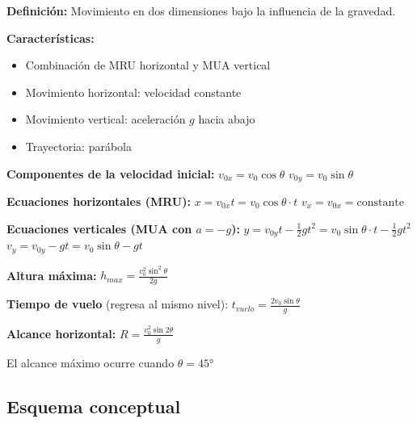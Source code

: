 \begin{seccion}

\begin{definicion}
    \textbf{Definición:} Movimiento en dos dimensiones bajo la influencia de la gravedad.
\end{definicion}

\vspace{0.3cm}

\textbf{Características:}
\begin{itemize}
    \item Combinación de MRU horizontal y MUA vertical
    \item Movimiento horizontal: velocidad constante
    \item Movimiento vertical: aceleración $g$ hacia abajo
    \item Trayectoria: parábola
\end{itemize}

\begin{ecuacion}
\textbf{Componentes de la velocidad inicial:}
$v_{0x} = v_0 \cos \theta$
$v_{0y} = v_0 \sin \theta$

\textbf{Ecuaciones horizontales (MRU):}
$x = v_{0x} t = v_0 \cos \theta \cdot t$
$v_x = v_{0x} = \text{constante}$

\textbf{Ecuaciones verticales (MUA con $a = -g$):}
$y = v_{0y} t - \frac{1}{2}gt^2 = v_0 \sin \theta \cdot t - \frac{1}{2}gt^2$
$v_y = v_{0y} - gt = v_0 \sin \theta - gt$

\textbf{Altura máxima:}
$h_{max} = \frac{v_0^2 \sin^2 \theta}{2g}$

\textbf{Tiempo de vuelo} (regresa al mismo nivel):
$t_{vuelo} = \frac{2v_0 \sin \theta}{g}$

\textbf{Alcance horizontal:}
$R = \frac{v_0^2 \sin 2\theta}{g}$

El alcance máximo ocurre cuando $\theta = 45°$
\end{ecuacion}
\end{seccion}

\subsection{Esquema conceptual}

